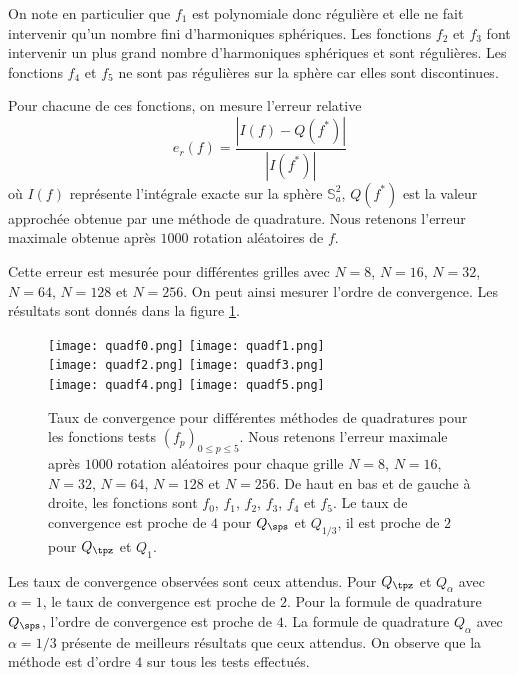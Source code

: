 On note en particulier que $f_1$ est polynomiale donc régulière et elle ne fait intervenir qu'un nombre fini d'harmoniques sphériques. Les fonctions $f_2$ et $f_3$ font intervenir un plus grand nombre d'harmoniques sphériques et sont régulières.
Les fonctions $f_4$ et $f_5$ ne sont pas régulières sur la sphère car elles sont discontinues. 

Pour chacune de ces fonctions, on mesure l'erreur relative
\begin{equation}
e_r(f) = \dfrac{|I(f) - Q(f^*)|}{|I(f^*)|}
\end{equation}
où $I(f)$ représente l'intégrale exacte sur la sphère $\mathbb{S}_a^2$, $Q(f^*)$ est la valeur approchée obtenue par une méthode de quadrature.
Nous retenons l'erreur maximale obtenue après $1000$ rotation aléatoires de $f$.

Cette erreur est mesurée pour différentes grilles avec $N=8$, $N=16$, $N=32$, $N=64$, $N=128$ et $N=256$. On peut ainsi mesurer l'ordre de convergence. Les résultats sont donnés dans la figure \ref{fig:rate_quad}.


\begin{figure}[htbp]
\begin{center}
\texttt{[image: quadf0.png]}
\texttt{[image: quadf1.png]}\\
\texttt{[image: quadf2.png]}
\texttt{[image: quadf3.png]}\\
\texttt{[image: quadf4.png]}
\texttt{[image: quadf5.png]}\\
\end{center}
\caption{Taux de convergence pour différentes méthodes de quadratures pour les fonctions tests $(f_p)_{0 \leq p \leq 5}$. Nous retenons l'erreur maximale après $1000$ rotation aléatoires pour chaque grille $N=8$, $N=16$, $N=32$, $N=64$, $N=128$ et $N=256$. De haut en bas et de gauche à droite, les fonctions sont $f_0$, $f_1$, $f_2$, $f_3$, $f_4$ et $f_5$. Le taux de convergence est proche de $4$ pour $Q_{\sps}$ et $Q_{1/3}$, il est proche de $2$ pour $Q_{\tpz}$ et $Q_1$.}
\label{fig:rate_quad}
\end{figure}

Les taux de convergence observées sont ceux attendus. Pour $Q_{\tpz}$ et $Q_{\alpha}$ avec $\alpha=1$, le taux de convergence est proche de $2$. Pour la formule de quadrature $Q_{\sps}$, l'ordre de convergence est proche de $4$. La formule de quadrature $Q_{\alpha}$ avec $\alpha = 1/3$ présente de meilleurs résultats que ceux attendus. On observe que la méthode est d'ordre $4$ sur tous les tests effectués.




















